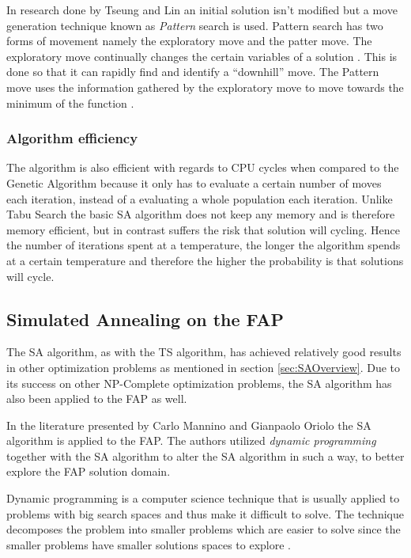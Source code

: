 In research done by Tseung and Lin \cite{CurveFittingSA} an initial solution isn't modified but a move generation technique known as \emph{Pattern} search is used. Pattern search has two forms of movement namely the exploratory move and the patter move. The exploratory move continually changes the certain variables of a solution \cite{CurveFittingSA}. This is done so that it can rapidly find and identify a ``downhill'' move. The Pattern move uses the information gathered by the exploratory move to move towards the minimum of the function \cite{CurveFittingSA}.
\subsubsection{Algorithm efficiency}
The algorithm is also efficient with regards to CPU cycles when compared to the Genetic Algorithm because it only has to evaluate a certain number of moves each iteration, instead of a evaluating a whole population each iteration. Unlike Tabu Search the basic SA algorithm does not keep any memory and is therefore memory efficient, but in contrast suffers the risk that solution will cycling. Hence the number of iterations spent at a temperature, the longer the algorithm spends at a certain temperature and therefore the higher the probability is that solutions will cycle.
\subsection{Simulated Annealing on the FAP}
The SA algorithm, as with the TS algorithm, has achieved relatively good results in other optimization problems as mentioned in section \ref{sec:SAOverview}. Due to its success on other NP-Complete optimization problems, the SA algorithm has also been applied to the FAP as well.

In the literature presented by Carlo Mannino and Gianpaolo Oriolo\cite{SolvingSuperIntervalGraphs} the SA algorithm is applied to the FAP. The authors utilized \emph{dynamic programming} together with the SA algorithm to alter the SA algorithm in such a way, to better explore the FAP solution domain.

Dynamic programming is a computer science technique that is usually applied to problems with big search spaces and thus make it difficult to solve\cite{AIModernApproach}. The technique decomposes the problem into smaller problems which are easier to solve since the smaller problems have smaller solutions spaces to explore \cite{AIModernApproach,IntroMathProgramming}.

